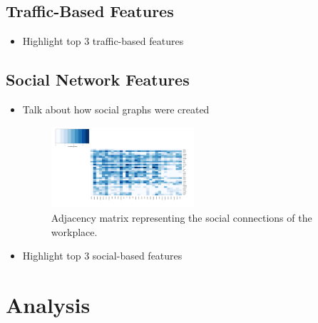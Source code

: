 \documentclass{article}
\begin{document}
\subsection{Traffic-Based Features}
\begin{itemize}
\item Highlight top 3 traffic-based features
\end{itemize}
\subsection{Social Network Features}
\begin{itemize}
\item Talk about how social graphs were created
\begin{figure}[H]
    \centering
        \includegraphics[width=0.5\textwidth]{adj_matrix}
        \caption{Adjacency matrix representing the social connections of the workplace.}
        \label{fig:var_imp}
\end{figure}
\item Highlight top 3 social-based features
\end{itemize}

\section{Analysis} \label{Analysis}
\end{document}
